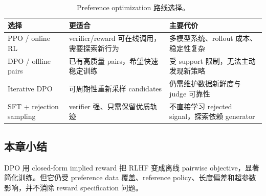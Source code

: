 \begin{table}[H]
\centering
\begin{tabular}{L{0.18\textwidth}L{0.31\textwidth}L{0.41\textwidth}}
\toprule
选择 & 更适合 & 主要代价 \\
\midrule
PPO / online RL & verifier/reward 可在线调用，需要探索新行为 & 多模型系统、rollout 成本、稳定性复杂 \\
DPO / offline pairs & 已有高质量 pairs，希望快速稳定训练 & 受 support 限制，无法主动发现新策略 \\
Iterative DPO & 可周期性重新采样 candidates & 仍需维护数据新鲜度与 judge 可靠性 \\
SFT + rejection sampling & verifier 强、只需保留优质轨迹 & 不直接学习 rejected signal，探索依赖 generator \\
\bottomrule
\end{tabular}
\caption{Preference optimization 路线选择。}
\end{table}

\subsection{本章小结}

DPO 用 closed-form implied reward 把 RLHF 变成离线 pairwise objective，显著简化训练。但它仍受 preference data 覆盖、reference policy、长度偏差和超参数影响，并不消除 reward specification 问题。

